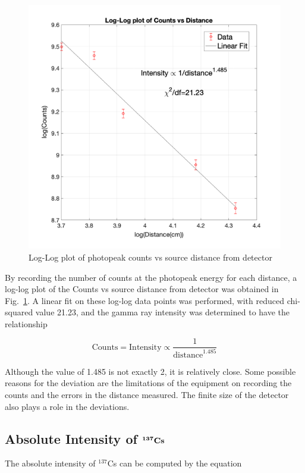 \documentclass[%
 aip,
rsi,%
 amsmath,amssymb,
 reprint,%
author-numerical,%
]{revtex4-1}
\begin{document}
\begin{figure}[H]
\centering
\includegraphics[width=0.95\linewidth]{lateximages/inversesquare.png} 
\caption{\label{fig:inversesquare}  Log-Log plot of photopeak counts vs source distance from detector}
\end{figure}

By recording the number of counts at the photopeak energy for each distance, a log-log plot of the Counts vs source distance from detector was obtained in Fig.~\ref{fig:inversesquare}. A linear fit on these log-log data points was performed, with reduced chi-squared value 21.23, and the gamma ray intensity was determined to have the relationship

\begin{equation}
\text{Counts}=\text{Intensity}\propto \frac{1}{\text{distance}^{1.485}}
 \label{eq:twelve}
\end{equation}

Although the value of 1.485 is not exactly 2, it is relatively close. Some possible reasons for the deviation are the limitations of the equipment on recording the counts and the errors in the distance measured. The finite size of the detector also plays a role in the deviations.


\subsection{Absolute Intensity of $\bf{ ^ { 137 }Cs }$ }
The absolute intensity of  $^ { 137 }$Cs can be computed by the equation
\end{document}
